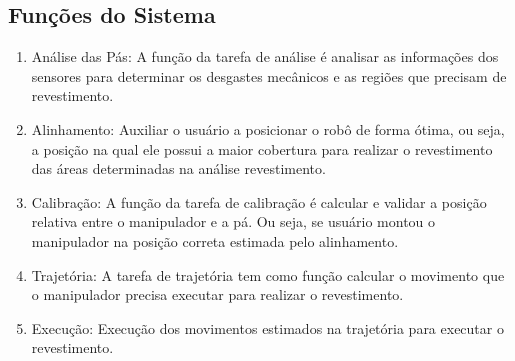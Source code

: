 \documentclass[12pt,a4paper]{article}
\begin{document}
\subsection{Funções do Sistema}
\begin {enumerate}
  \item Análise das Pás: A função da tarefa de análise é analisar as informações dos sensores para determinar os desgastes mecânicos e as regiões que precisam de revestimento.
  \item Alinhamento: Auxiliar o usuário a posicionar o robô de forma ótima, ou
  seja, a posição na qual ele possui a maior cobertura para realizar o revestimento das áreas determinadas na análise revestimento.
  \item Calibração: A função da tarefa de calibração é calcular e validar a
  posição relativa entre o manipulador e a pá. Ou seja, se usuário montou o manipulador na posição correta estimada pelo alinhamento.
  \item  Trajetória: A tarefa de trajetória tem como função calcular o movimento
  que o manipulador precisa executar para realizar o revestimento.
  \item Execução: Execução dos movimentos estimados na trajetória para executar
  o revestimento.
\end{enumerate}
\end{document}
